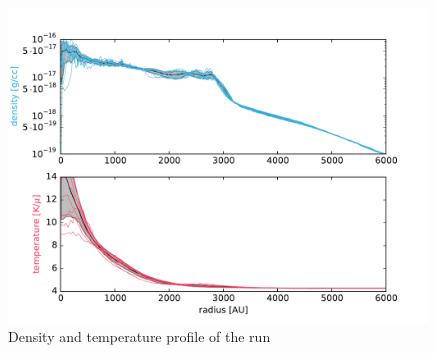 \begin{figure}[!htb]
 \centering
 \includegraphics[width=0.99\textwidth]{Figures/var_rt_profiles/timeave_n1c01_6000AU}
 \captionsetup{justification=justified,singlelinecheck=false,width=\linewidth}
 \decoRule
 \caption[ profiles]{Density and temperature profile of the  run}
\label{fig:n1c0.1_profile}
\end{figure}
\FloatBarrier


